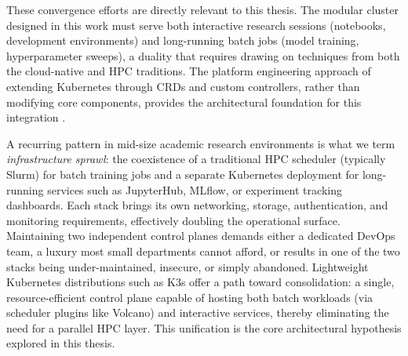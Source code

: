 These convergence efforts are directly relevant to this thesis. The modular cluster designed in this work must serve both interactive research sessions (notebooks, development environments) and long-running batch jobs (model training, hyperparameter sweeps), a duality that requires drawing on techniques from both the cloud-native and HPC traditions. The platform engineering approach of extending Kubernetes through CRDs and custom controllers, rather than modifying core components, provides the architectural foundation for this integration \citep{salatino2024platform, domingus2022cloud}.

A recurring pattern in mid-size academic research environments is what we term \emph{infrastructure sprawl}: the coexistence of a traditional HPC scheduler (typically Slurm) for batch training jobs and a separate Kubernetes deployment for long-running services such as JupyterHub, MLflow, or experiment tracking dashboards. Each stack brings its own networking, storage, authentication, and monitoring requirements, effectively doubling the operational surface. Maintaining two independent control planes demands either a dedicated DevOps team, a luxury most small departments cannot afford, or results in one of the two stacks being under-maintained, insecure, or simply abandoned. Lightweight Kubernetes distributions such as K3s offer a path toward consolidation: a single, resource-efficient control plane capable of hosting both batch workloads (via scheduler plugins like Volcano) and interactive services, thereby eliminating the need for a parallel HPC layer. This unification is the core architectural hypothesis explored in this thesis.

